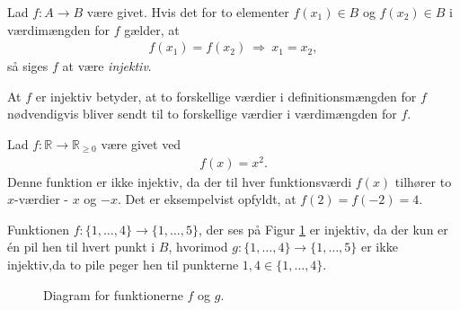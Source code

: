 \newpage
\begin{defn}
	Lad $f:A \to B$ være givet. Hvis det for to elementer $f(x_1)\in B$ og $f(x_2)\in B$ i 		    værdimængden for $f$ gælder, at
	\begin{align*}
		f(x_1) = f(x_2) \ \Rightarrow \ x_1 = x_2,
	\end{align*}	 
	så siges $f$ at være \textit{injektiv}. 
\end{defn}
At $f$ er injektiv betyder, at to forskellige værdier i definitionsmængden for $f$ nødvendigvis bliver sendt til to forskellige værdier i værdimængden for $f$.
\begin{exa}
	Lad $f:\mathbb{R} \to \mathbb{R}_{\geq 0}$ være givet ved
	\begin{align*}
	f(x) = x^2.
	\end{align*}
	Denne funktion er ikke injektiv, da der til hver funktionsværdi $f(x)$ tilhører to $x$-værdier - $x$ og $-x$. Det er 	eksempelvist opfyldt, at $f(2) = f(-2) = 4$. 
\end{exa}
\begin{exa}
	Funktionen $f: \{1,\hdots,4\} \to \{1,\hdots, 5\}$, der ses på Figur \ref{fig:inj}
	 er injektiv,  da der kun er én pil hen til hvert
	punkt i $B$, hvorimod
	 $g:\{1,\hdots,4\} \to \{1,\hdots, 5\}$ er ikke injektiv,da to pile peger hen til punkterne $1,4\in \{1,\hdots,4\}$.
	\begin{figure}[H]
		\centering
		\caption{Diagram for funktionerne $f$ og $g$.}
		\label{fig:inj}
	\end{figure} 
\end{exa}

